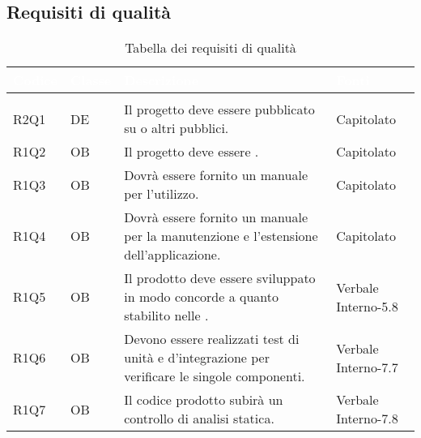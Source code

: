 \subsection{Requisiti di qualità}
{
\setlength\arrayrulewidth{1pt}
\begin{longtable}{C{2cm} | C{1.5cm} | C{9cm} | C{3.3cm}}
		\textcolor{white}{\textbf{Codice}} & 
		\textcolor{white}{\textbf{Classe}} & 
		\textcolor{white}{\textbf{Descrizione}} & 
		\textcolor{white}{\textbf{Fonti}} \\
		\endfirsthead
	    \\
	    \endfoot
	    \caption{Tabella dei requisiti di qualità}
	    \endlastfoot

R2Q1 & DE & Il progetto deve essere pubblicato su  o altri  pubblici. & Capitolato \\
R1Q2 & OB & Il progetto deve essere . & Capitolato\\
R1Q3 & OB & Dovrà essere fornito un manuale per l'utilizzo. & Capitolato\\
R1Q4 & OB & Dovrà essere fornito un manuale per la manutenzione e l'estensione dell'applicazione. & Capitolato\\
R1Q5 & OB & Il prodotto deve essere sviluppato in modo concorde a quanto stabilito nelle \NdPv{}. & Verbale Interno-5.8\\
R1Q6 & OB & Devono essere realizzati test di unità e d'integrazione per verificare le singole componenti. & Verbale Interno-7.7\\
R1Q7 & OB & Il codice prodotto subirà un controllo di analisi statica.  & Verbale Interno-7.8\\

\end{longtable}
}
